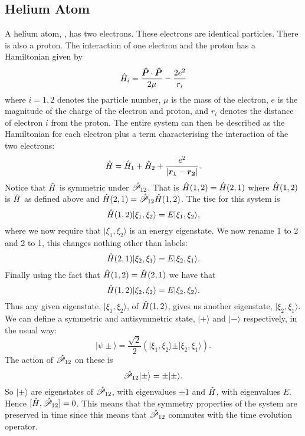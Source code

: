 \documentclass[a4paper]{article}
\renewcommand{\ket}[1]{\vert {#1} \rangle}
\newcommand{\parity}{\mathscr{P}}
\newcommand{\vecoperator}[1]{\vv{\operator{#1}}}
\theoremstyle{definition}
\begin{document}
    \subsection{Helium Atom}
    A helium atom, , has two electrons.
    These electrons are identical particles.
    There is also a proton.
    The interaction of one electron and the proton has a Hamiltonian given by
    \[\operator{H}_i = \frac{\vecoperator{P}\cdot\vecoperator{P}}{2\mu} - \frac{2e^2}{r_i}\]
    where \(i = 1, 2\) denotes the particle number, \(\mu\) is the mass of the electron, \(e\) is the magnitude of the charge of the electron and proton, and \(r_i\) denotes the distance of electron \(i\) from the proton.
    The entire system can then be described as the Hamiltonian for each electron plus a term characterising the interaction of the two electrons:
    \[\hat{H} = \hat{H}_1 + \hat{H}_2 + \frac{e^2}{\abs{\bm{r_1} - \bm{r_2}}}.\]
    Notice that \(\hat{H}\) is symmetric under \(\operator{\parity}_{12}\).
    That is \(\hat{H}(1, 2) = \hat{H}(2, 1)\) where \(\hat{H}(1, 2)\) is \(\hat{H}\) as defined above and \(\operator{H}(2, 1) = \operator{\parity}_{12}\operator{H}(1, 2)\).
    The \gls{tise} for this system is
    \[\operator{H}(1, 2)\ket{\xi_1, \xi_2} = E\ket{\xi_1, \xi_2},\]
    where we now require that \(\ket{\xi_1, \xi_2}\) is an energy eigenstate.
    We now rename 1 to 2 and 2 to 1, this changes nothing other than labels:
    \[\operator{H}(2, 1)\ket{\xi_2, \xi_1} = E\ket{\xi_2, \xi_1}.\]
    Finally using the fact that \(\hat{H}(1, 2) = \hat{H}(2, 1)\) we have that
    \[\operator{H}(1, 2)\ket{\xi_2, \xi_2} = E\ket{\xi_2, \xi_2}.\]
    Thus any given eigenstate, \(\ket{\xi_1, \xi_2}\), of \(\hat{H}(1, 2)\), gives us another eigenstate, \(\ket{\xi_2, \xi_1}\).
    We can define a symmetric and antisymmetric state, \(\ket{+}\) and \(\ket{-}\) respectively, in the usual way:
    \[\ket{\psi\pm} = \frac{\sqrt{2}}{2}(\ket{\xi_1, \xi_2} \pm \ket{\xi_2, \xi_1}).\]
    The action of \(\operator{\parity}_{12}\) on these is
    \[\operator{\parity}_{12}\ket{\pm} = \pm\ket{\pm}.\]
    So \(\ket{\pm}\) are eigenstates of \(\operator{\parity}_{12}\), with eigenvalues \(\pm 1\) and \(\hat{H}\), with eigenvalues \(E\).
    Hence \([\operator{H}, \operator{\parity}_{12}] = 0\).
    This means that the symmetry properties of the system are preserved in time since this means that \(\operator{\parity}_{12}\) commutes with the time evolution operator.
    
\end{document}
